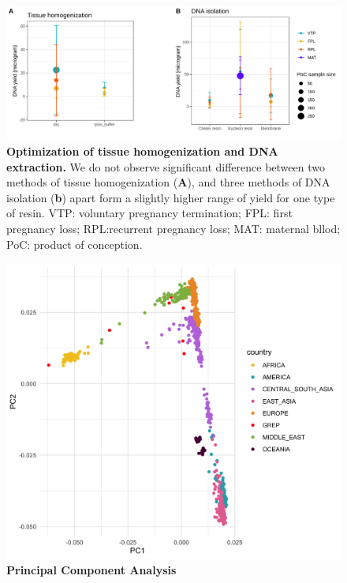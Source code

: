 \begin{figure}[ht]
    \centering
    \includegraphics[width= 14 cm, high= 16cm]{fig/panelDNA.png}
    \caption{\textbf{Optimization of tissue homogenization and DNA extraction.} We do not observe significant difference between two methods of tissue homogenization (\textbf{A}), and three methods of DNA isolation (\textbf{b}) apart form a slightly higher range of yield for one type of resin. VTP: voluntary pregnancy termination;  FPL: first pregnancy loss; RPL:recurrent pregnancy loss;  MAT: maternal bllod; PoC: product of conception.}
    \label{fig:dna}
\end{figure}




\begin{figure}[ht]
    \centering
    \includegraphics[width= 14 cm, high= 16cm]{fig/pca_hgdp-grep_noALPHA.png}
    \caption{\textbf{Principal Component Analysis  }}
    \label{fig:pca}
\end{figure}


